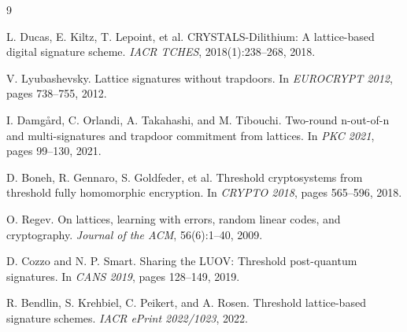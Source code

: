 \documentclass[11pt,a4paper]{article}
\begin{document}

\begin{thebibliography}{9}

L. Ducas, E. Kiltz, T. Lepoint, et al.
\newblock CRYSTALS-Dilithium: A lattice-based digital signature scheme.
\newblock \textit{IACR TCHES}, 2018(1):238--268, 2018.

V. Lyubashevsky.
\newblock Lattice signatures without trapdoors.
\newblock In \textit{EUROCRYPT 2012}, pages 738--755, 2012.

I. Damg{\aa}rd, C. Orlandi, A. Takahashi, and M. Tibouchi.
\newblock Two-round n-out-of-n and multi-signatures and trapdoor commitment from lattices.
\newblock In \textit{PKC 2021}, pages 99--130, 2021.

D. Boneh, R. Gennaro, S. Goldfeder, et al.
\newblock Threshold cryptosystems from threshold fully homomorphic encryption.
\newblock In \textit{CRYPTO 2018}, pages 565--596, 2018.

O. Regev.
\newblock On lattices, learning with errors, random linear codes, and cryptography.
\newblock \textit{Journal of the ACM}, 56(6):1--40, 2009.

D. Cozzo and N. P. Smart.
\newblock Sharing the LUOV: Threshold post-quantum signatures.
\newblock In \textit{CANS 2019}, pages 128--149, 2019.

R. Bendlin, S. Krehbiel, C. Peikert, and A. Rosen.
\newblock Threshold lattice-based signature schemes.
\newblock \textit{IACR ePrint 2022/1023}, 2022.

\end{thebibliography}
\end{document}
